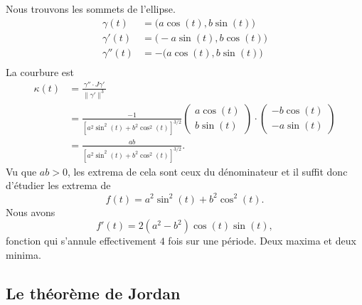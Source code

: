 \begin{example}
    Nous trouvons les sommets de l'ellipse.
    \begin{subequations}
        \begin{align}
            \gamma(t)&=\big( a\cos(t),b\sin(t) \big)\\
            \gamma'(t)&=\big( -a\sin(t),b\cos(t) \big)\\
            \gamma''(t)&=-\big( a\cos(t),b\sin(t) \big)\\
        \end{align}
    \end{subequations}
    La courbure est
    \begin{subequations}
        \begin{align}
        \kappa(t)&=\frac{ \gamma''\cdot J\gamma' }{ \| \gamma' \|^3 }\\
        &=\frac{-1}{ [a^2\sin^2(t)+b^2\cos^2(t)]^{3/2} }\begin{pmatrix}
            a\cos(t)    \\ 
            b\sin(t)    
        \end{pmatrix}\cdot\begin{pmatrix}
            -b\cos(t)    \\ 
            -a\sin(t)    
        \end{pmatrix}\\
        &=\frac{ ab }{  [a^2\sin^2(t)+b^2\cos^2(t)]^{3/2}  }.
        \end{align}
    \end{subequations}
    Vu que \( ab>0\), les extrema de cela sont ceux du dénominateur et il suffit donc d'étudier les extrema de
    \begin{equation}
        f(t)=a^2\sin^2(t)+b^2\cos^2(t).
    \end{equation}
    Nous avons 
    \begin{equation}
        f'(t)=2(a^2-b^2)\cos(t)\sin(t),
    \end{equation}
    fonction qui s'annule effectivement $4$ fois sur une période. Deux maxima et deux minima.
\end{example}

\subsection{Le théorème de Jordan}

